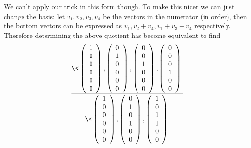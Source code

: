 We can't apply our trick in this form though. To make this nicer we can just change the basis: let $v_1,v_2,v_3,v_4$ be the vectors in the numerator (in order), then the bottom vectors can be expressed as $v_1,v_2+v_4,v_1+v_3+v_4$ respectively. Therefore determining the above quotient has become equivalent to find
\[ \frac{ \< \left( \begin{array}{r} 1\\0\\0\\0\\0\\0 \end{array} \right),
             \left( \begin{array}{r} 0\\1\\0\\0\\0\\0 \end{array} \right),
             \left( \begin{array}{r} 0\\0\\1\\0\\0\\0 \end{array} \right),
             \left( \begin{array}{r} 0\\0\\0\\1\\0\\0 \end{array} \right)
           \>}{ \< 
             \left( \begin{array}{r} 1\\0\\0\\0\\0\\0 \end{array} \right), 
             \left( \begin{array}{r} 0\\1\\0\\1\\0\\0 \end{array} \right), 
             \left( \begin{array}{r} 1\\0\\1\\1\\0\\0 \end{array} \right) 
\> } \]

